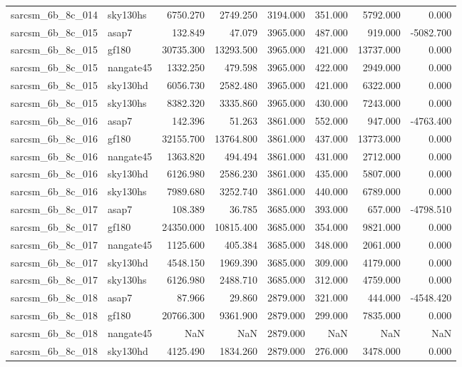 \begin{tabular}{llrrrrrr}
sarcsm\_6b\_8c\_014 & sky130hs & 6750.270 & 2749.250 & 3194.000 & 351.000 & 5792.000 & 0.000 \\
sarcsm\_6b\_8c\_015 & asap7 & 132.849 & 47.079 & 3965.000 & 487.000 & 919.000 & -5082.700 \\
sarcsm\_6b\_8c\_015 & gf180 & 30735.300 & 13293.500 & 3965.000 & 421.000 & 13737.000 & 0.000 \\
sarcsm\_6b\_8c\_015 & nangate45 & 1332.250 & 479.598 & 3965.000 & 422.000 & 2949.000 & 0.000 \\
sarcsm\_6b\_8c\_015 & sky130hd & 6056.730 & 2582.480 & 3965.000 & 421.000 & 6322.000 & 0.000 \\
sarcsm\_6b\_8c\_015 & sky130hs & 8382.320 & 3335.860 & 3965.000 & 430.000 & 7243.000 & 0.000 \\
sarcsm\_6b\_8c\_016 & asap7 & 142.396 & 51.263 & 3861.000 & 552.000 & 947.000 & -4763.400 \\
sarcsm\_6b\_8c\_016 & gf180 & 32155.700 & 13764.800 & 3861.000 & 437.000 & 13773.000 & 0.000 \\
sarcsm\_6b\_8c\_016 & nangate45 & 1363.820 & 494.494 & 3861.000 & 431.000 & 2712.000 & 0.000 \\
sarcsm\_6b\_8c\_016 & sky130hd & 6126.980 & 2586.230 & 3861.000 & 435.000 & 5807.000 & 0.000 \\
sarcsm\_6b\_8c\_016 & sky130hs & 7989.680 & 3252.740 & 3861.000 & 440.000 & 6789.000 & 0.000 \\
sarcsm\_6b\_8c\_017 & asap7 & 108.389 & 36.785 & 3685.000 & 393.000 & 657.000 & -4798.510 \\
sarcsm\_6b\_8c\_017 & gf180 & 24350.000 & 10815.400 & 3685.000 & 354.000 & 9821.000 & 0.000 \\
sarcsm\_6b\_8c\_017 & nangate45 & 1125.600 & 405.384 & 3685.000 & 348.000 & 2061.000 & 0.000 \\
sarcsm\_6b\_8c\_017 & sky130hd & 4548.150 & 1969.390 & 3685.000 & 309.000 & 4179.000 & 0.000 \\
sarcsm\_6b\_8c\_017 & sky130hs & 6126.980 & 2488.710 & 3685.000 & 312.000 & 4759.000 & 0.000 \\
sarcsm\_6b\_8c\_018 & asap7 & 87.966 & 29.860 & 2879.000 & 321.000 & 444.000 & -4548.420 \\
sarcsm\_6b\_8c\_018 & gf180 & 20766.300 & 9361.900 & 2879.000 & 299.000 & 7835.000 & 0.000 \\
sarcsm\_6b\_8c\_018 & nangate45 & NaN & NaN & 2879.000 & NaN & NaN & NaN \\
sarcsm\_6b\_8c\_018 & sky130hd & 4125.490 & 1834.260 & 2879.000 & 276.000 & 3478.000 & 0.000 \\

\end{tabular}
